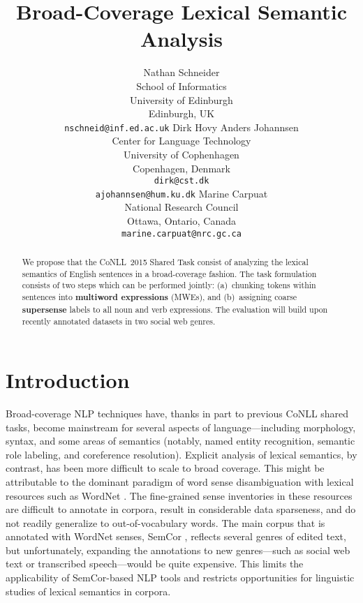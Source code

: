 \documentclass[11pt]{article}
\title{Broad-Coverage Lexical Semantic Analysis}
\author{
Nathan Schneider \\
		School of Informatics\\
	   	University of Edinburgh\\
	    Edinburgh, UK\\
	    {\tt nschneid@inf.ed.ac.uk} \And
Dirk Hovy \quad Anders Johannsen\\
Center for Language Technology\\
University of Cophenhagen\\
Copenhagen, Denmark\\
{\tt dirk@cst.dk}\\ {\tt ajohannsen@hum.ku.dk} \And
Marine Carpuat\\
National Research Council\\
Ottawa, Ontario, Canada\\
{\tt marine.carpuat@nrc.gc.ca}}
\date{}
\newcommand{\ensuretext}[1]{#1}
\newcommand{\nssmarker}{\ensuretext{\textcolor{magenta}{\ensuremath{^{\textsc{NS}}_{\textsc{S}}}}}}
\newcommand{\arkcomment}[3]{\ensuretext{\textcolor{#3}{[#1 #2]}}}
\newcommand{\nss}[1]{\arkcomment{\nssmarker}{#1}{magenta}}
\newcommand{\longversion}[1]{} %
\begin{document}
\maketitle

\begin{abstract}
We propose that the CoNLL~2015 Shared Task 
consist of analyzing the lexical semantics of English sentences 
in a broad-coverage fashion. 
The task formulation consists of two steps which can be performed jointly:
(a)~chunking tokens within sentences into \textbf{multiword expressions} (MWEs), and 
(b)~assigning coarse \textbf{supersense} labels to all noun and verb expressions. 
The evaluation will build upon recently annotated datasets in two social web genres.
\longversion{We expect that the task formulation will foster engagement across 
multiple subcommunities of computational semantics, 
and facilitate empirical comparison of methodologically diverse systems.}
\end{abstract}

\section{Introduction}\label{sec:intro}

Broad-coverage NLP techniques have, thanks in part to previous CoNLL shared tasks, 
become mainstream for several aspects of language---including morphology, syntax, 
and some areas of semantics (notably, named entity recognition, %
semantic role labeling, %
and coreference resolution). %
Explicit analysis of lexical semantics, by contrast, has been more difficult to scale 
to broad coverage. %
This might be attributable to the dominant paradigm of word sense disambiguation 
with lexical resources such as WordNet \citep{wordnet}.
The fine-grained sense inventories in these resources 
are difficult to annotate in corpora, result in considerable data sparseness, 
and do not readily generalize to out-of-vocabulary words.
The main corpus that is annotated with WordNet senses, 
SemCor \citep{semcor}, reflects several genres of edited text, but
unfortunately, expanding the annotations to new genres---such as social web text 
or transcribed speech---would be quite expensive.
This limits the applicability of SemCor-based NLP tools 
and restricts opportunities for linguistic studies of lexical semantics in corpora.
\end{document}
